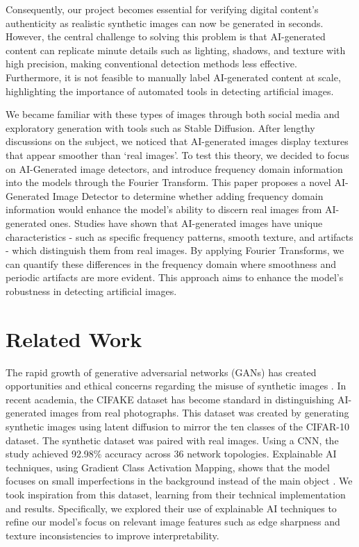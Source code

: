Consequently, our project becomes essential for verifying digital content's authenticity as realistic synthetic images can now be generated in seconds. However, the central challenge to solving this problem is that AI-generated content can replicate minute details such as lighting, shadows, and texture with high precision, making conventional detection methods less effective. Furthermore, it is not feasible to manually label AI-generated content at scale, highlighting the importance of automated tools in detecting artificial images.

We became familiar with these types of images through both social media and exploratory generation with tools such as Stable Diffusion. After lengthy discussions on the subject, we noticed that AI-generated images display textures that appear smoother than ‘real images’. To test this theory, we decided to focus on AI-Generated image detectors, and introduce frequency domain information into the models through the Fourier Transform. This paper proposes a novel AI-Generated Image Detector to determine whether adding frequency domain information would enhance the model’s ability to discern real images from AI-generated ones. Studies have shown that AI-generated images have unique characteristics - such as specific frequency patterns, smooth texture, and artifacts - which distinguish them from real images. By applying Fourier Transforms, we can quantify these differences in the frequency domain where smoothness and periodic artifacts are more evident. This approach aims to enhance the model's robustness in detecting artificial images.

\section{Related Work}

The rapid growth of generative adversarial networks (GANs) has created opportunities and ethical concerns regarding the misuse of synthetic images \cite{2, 3, 6}. In recent academia, the CIFAKE dataset has become standard in distinguishing AI-generated images from real photographs. This dataset was created by generating synthetic images using latent diffusion to mirror the ten classes of the CIFAR-10 dataset. The synthetic dataset was paired with real images. Using a CNN, the study achieved 92.98\% accuracy across 36 network topologies. Explainable AI techniques, using Gradient Class Activation Mapping, shows that the model focuses on small imperfections in the background instead of the main object \cite{5}. We took inspiration from this dataset, learning from their technical implementation and results. Specifically, we explored their use of explainable AI techniques to refine our model's focus on relevant image features such as edge sharpness and texture inconsistencies to improve interpretability.
 
